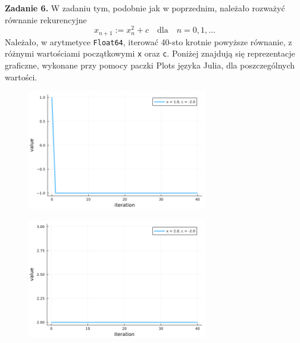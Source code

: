 \documentclass[15pt, a4paper]{article}
\begin{document}
\vspace{0.5cm}

\noindent\hrulefill

 
\vspace{0.5cm}

\noindent\textbf{Zadanie 6.} W zadaniu tym, podobnie jak w poprzednim, należało rozważyć równanie rekurencyjne  
\[
    x_{n+1} := x_n^2 + c \quad \mathrm{dla} \quad n = 0, 1, \ldots
\]
Należało, w arytmetyce \verb|Float64|, iterować 40-sto krotnie powyższe równanie, z różnymi wartościami początkowymi \verb|x| oraz \verb|c|. Poniżej znajdują się reprezentacje graficzne, wykonane przy pomocy paczki Plots języka Julia, dla poszczególnych wartości.

\vspace{0.5cm}

\begin{figure}[h]
    \centering
    \includegraphics[width=0.7\textwidth]{img/6_1_plot.png}
\end{figure}

\begin{figure}[h]
    \centering
    \includegraphics[width=0.7\textwidth]{img/6_2_plot.png}
\end{figure}

\vspace{0.5cm}
\end{document}

